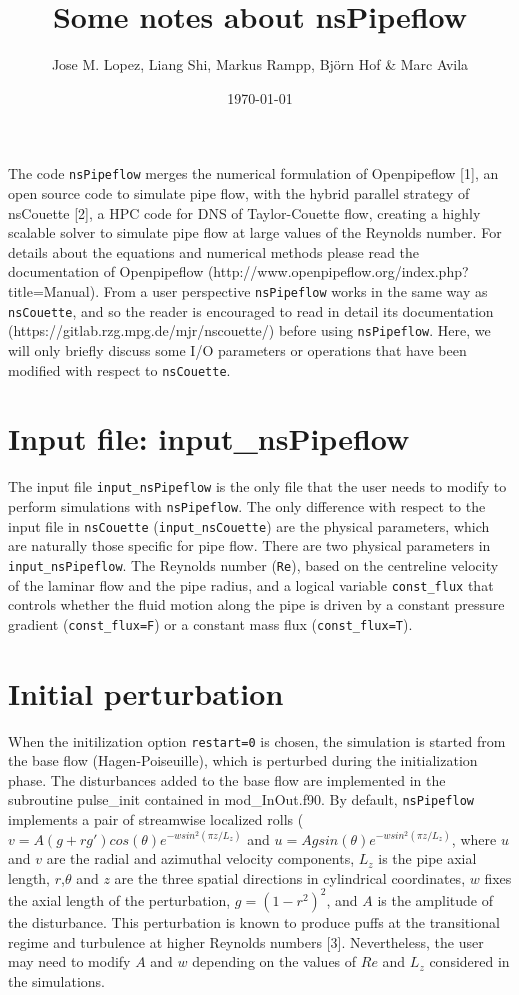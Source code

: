 \documentclass[11pt,a4paper]{article}
\title{Some notes about nsPipeflow}
\author
{
  Jose M. Lopez, Liang Shi, Markus Rampp, Bj\"orn Hof \& Marc Avila\\
  }
\date{\today}
\begin{document}
\maketitle



\noindent The code \verb+nsPipeflow+ merges the numerical formulation
of Openpipeflow [1], an open source code to simulate pipe flow,
with the hybrid parallel strategy of nsCouette [2], a HPC
code for DNS of Taylor-Couette flow, creating a highly scalable solver
to simulate pipe flow at large values of the Reynolds number. For details
about the equations and numerical methods please read the documentation
of Openpipeflow (http://www.openpipeflow.org/index.php?title=Manual).
From a user perspective \verb+nsPipeflow+ works in the same way as \verb+nsCouette+,
and so the reader is encouraged to read in detail its documentation
(https://gitlab.rzg.mpg.de/mjr/nscouette/) before using \verb+nsPipeflow+. Here,
we will only briefly discuss some I/O parameters or operations that have been
modified with respect to \verb+nsCouette+.

\section{Input file: input\_nsPipeflow}

The input file \verb+input_nsPipeflow+ is the only file that
the user needs to modify to perform simulations with
\verb+nsPipeflow+. The only difference with respect to the
input file in \verb+nsCouette+ (\verb+input_nsCouette+)
are the physical parameters, which are naturally those specific
for pipe flow. There are two physical parameters in
\verb+input_nsPipeflow+. The Reynolds number (\verb+Re+), based on the centreline
velocity of the laminar flow and the pipe radius, and a logical
variable \verb+const_flux+ that controls whether the fluid motion along
the pipe is driven by a constant pressure gradient (\verb+const_flux=F+)
or a constant mass flux (\verb+const_flux=T+).

\section{Initial perturbation}

When the initilization option \verb+restart=0+ is chosen,
the simulation is started from the base flow (Hagen-Poiseuille),
which is perturbed during the initialization phase. The
disturbances added to the base flow are implemented in the subroutine
pulse\_init contained in mod\_InOut.f90. By default,
\verb+nsPipeflow+ implements a pair of streamwise localized
rolls ($v=A(g+rg') cos(\theta) e^{-wsin^2(\pi z/L_z)}$ and
$u=A g sin(\theta) e^{-wsin^2(\pi z/L_z)}$, where $u$ and $v$ are the
radial and azimuthal velocity components, $L_z$ is the pipe axial length,
$r$,$\theta$ and $z$ are the three spatial directions in cylindrical
coordinates, $w$ fixes the axial length of the perturbation,
$g=(1-r^2)^2$,  and $A$ is the amplitude of the
disturbance. This perturbation is known to produce puffs at the
transitional regime and turbulence at higher Reynolds numbers [3].
Nevertheless, the user may need to modify $A$ and $w$
depending on the values of $Re$ and $L_z$ considered in the simulations.
\end{document}
